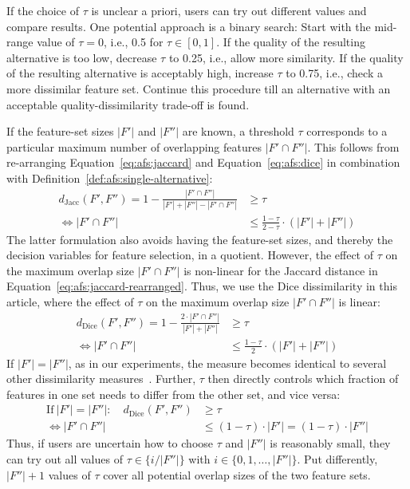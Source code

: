 \documentclass{article}
\theoremstyle{definition}
\begin{document}
If the choice of $\tau$ is unclear a priori, users can try out different values and compare results.
One potential approach is a binary search:
Start with the mid-range value of $\tau=0$, i.e., 0.5 for $\tau \in [0,1]$.
If the quality of the resulting alternative is too low, decrease $\tau$ to 0.25, i.e., allow more similarity.
If the quality of the resulting alternative is acceptably high, increase $\tau$ to 0.75, i.e., check a more dissimilar feature set.
Continue this procedure till an alternative with an acceptable quality-dissimilarity trade-off is found.

If the feature-set sizes $|F'|$ and $|F''|$ are known, a threshold $\tau$ corresponds to a particular maximum number of overlapping features $|F' \cap F''|$.
This follows from re-arranging Equation~\ref{eq:afs:jaccard} and Equation~\ref{eq:afs:dice} in combination with Definition~\ref{def:afs:single-alternative}:
%
\begin{equation}
	\begin{aligned}
		d_{\text{Jacc}}(F',F'') = 1 - \frac{|F' \cap F''|}{|F'| + |F''| - |F' \cap F''|} &\geq \tau \\
		\Leftrightarrow |F' \cap F''| &\leq \frac{1 - \tau}{2 - \tau} \cdot (|F'| + |F''|)
		\end{aligned}
	\label{eq:afs:jaccard-rearranged}
\end{equation}
%
The latter formulation also avoids having the feature-set sizes, and thereby the decision variables for feature selection, in a quotient.
However, the effect of $\tau$ on the maximum overlap size $|F' \cap F''|$ is non-linear for the Jaccard distance in Equation~\ref{eq:afs:jaccard-rearranged}.
Thus, we use the Dice dissimilarity in this article, where the effect of $\tau$ on the maximum overlap size $|F' \cap F''|$ is linear:
%
\begin{equation}
	\begin{aligned}
		d_{\text{Dice}}(F',F'') = 1 - \frac{2 \cdot |F' \cap F''|}{|F'| + |F''|} &\geq \tau \\
		\Leftrightarrow |F' \cap F''| &\leq \frac{1 - \tau}{2} \cdot (|F'| + |F''|)
	\end{aligned}
	\label{eq:afs:dice-rearranged}
\end{equation}
%
If $|F'| = |F''|$, as in our experiments, the measure becomes identical to several other dissimilarity measures~\cite{egghe2009new}.
Further, $\tau$ then directly controls which fraction of features in one set needs to differ from the other set, and vice versa:
%
\begin{equation}
	\begin{aligned}
		\text{If}~|F'| = |F''|: \quad d_{\text{Dice}}(F',F'') &\geq \tau \\
		\Leftrightarrow |F' \cap F''| &\leq (1 - \tau) \cdot |F'| = (1 - \tau) \cdot |F''|
	\end{aligned}
	\label{eq:afs:dice-rearranged-equal-size}
\end{equation}
%
Thus, if users are uncertain how to choose $\tau$ and $|F''|$ is reasonably small, they can try out all values of $\tau \in \{i / |F''|\}$ with $i \in \{0, 1, \dots, |F''|\}$.
Put differently, $|F''| + 1$ values of $\tau$ cover all potential overlap sizes of the two feature sets.
\end{document}
